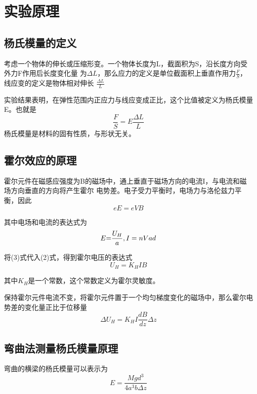 \documentclass[12pt,a4paper]{article}
\begin{document}
\section{实验原理}
    \subsection{杨氏模量的定义}
    考虑一个物体的伸长或压缩形变。一个物体长度为L，截面积为S，沿长度方向受外力F作用后长度变化量
    为$\Delta L$，那么应力的定义是单位截面积上垂直作用力$\frac{F}{S}$，线应变的定义是物体相对伸长
    $\frac{\Delta L}{L}$

    实验结果表明，在弹性范围内正应力与线应变成正比，这个比值被定义为杨氏模量E。也就是
    \begin{equation}
        \frac{F}{S}=E\frac{\Delta L}{L}
    \end{equation}
    杨氏模量是材料的固有性质，与形状无关。

    \subsection{霍尔效应的原理}
    霍尔元件在磁感应强度为B的磁场中，通上垂直于磁场方向的电流I，与电流和磁场方向垂直的方向将产生霍尔
    电势差。电子受力平衡时，电场力与洛伦兹力平衡，因此
    \begin{equation}
        eE=eVB
    \end{equation}

    其中电场和电流的表达式为
    \begin{equation}
        E{\rm{ = }}\frac{{{U_H}}}{a},I = nVad
    \end{equation}

    将(3)式代入(2)式，得到霍尔电压的表达式
    \begin{equation}
        U_H=K_HIB 
    \end{equation}

    其中$K_H$是一个常数，这个常数定义为霍尔灵敏度。\par
    保持霍尔元件电流不变，将霍尔元件置于一个均匀梯度变化的磁场中，那么霍尔电势差的变化量正比于位移量
    \begin{equation}
        \Delta U_H=K_HI\frac{dB}{dz}\Delta z
    \end{equation}

    \subsection{弯曲法测量杨氏模量原理}
    弯曲的横梁的杨氏模量可以表示为
    \begin{equation}
        E = \frac{{Mg{d^3}}}{{4{a^3}b\Delta z}}
    \end{equation}
\end{document}
